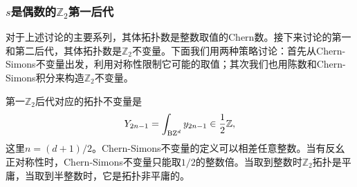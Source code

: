 \subsubsection{$s$是偶数的$\mathbb Z_2$第一后代}
对于上述讨论的主要系列，其体拓扑数是整数取值的Chern数。接下来讨论的第一和第二后代，其体拓扑数是$\mathbb Z_2$不变量。下面我们用两种策略讨论：首先从Chern-Simons不变量出发，利用对称性限制它可能的取值；其次我们也用陈数和Chern-Simons积分来构造$\mathbb Z_2$不变量。

第一$\mathbb Z_2$后代对应的拓扑不变量是
\begin{equation}
  Y_{2n-1} = \int_{\text{BZ}^d} y_{2n-1} \in \frac{1}{2}\mathbb Z,\label{csiy}
\end{equation}
这里$n=(d+1)/2$。Chern-Simons不变量的定义可以相差任意整数。当有反幺正对称性时，Chern-Simons不变量只能取$1/2$的整数倍。当取到整数时$\mathbb Z_2$拓扑是平庸，当取到半整数时，它是拓扑非平庸的。

